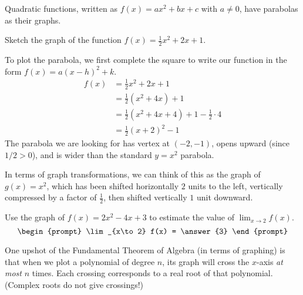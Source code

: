 \documentclass{ximera}
\begin{document}
Quadratic functions, written as $f(x) = ax^2 + bx + c$ with $a \ne 0$, have parabolas as their graphs.
\begin{example}
	Sketch the graph of the function $f(x) = \frac{1}{2} x^2 + 2x + 1$.
	\begin{explanation}
		To plot the parabola, we first complete the square to write our function in the form $f(x) = a(x-h)^2 +k$.
		\begin{align*}
			f(x) &= \frac{1}{2} x^2 + 2x + 1 \\
				&= \frac{1}{2} \left( x^2+ 4x \right) + 1\\
				&= \frac{1}{2}\left( x^2 + 4x + 4\right) + 1 - \frac{1}{2} \cdot 4\\
				&= \frac{1}{2} \left( x+2 \right)^2 -1
		\end{align*}
		The parabola we are looking for has vertex at $(-2, -1)$, opens upward (since $1/2 > 0$), and is wider than the standard
		$y=x^2$ parabola.
		
		In terms of graph transformations, we can think of this as the graph of $g(x) = x^2$, which has been shifted horizontally $2$ units to the left,
		vertically compressed by a factor of $\frac{1}{2}$, then shifted vertically $1$ unit downward.
	\end{explanation}
\end{example}


\begin{problem}
	Use the graph of $f(x) = 2x^2 - 4x + 3$ to estimate the value of $\lim_{x\to 2} f(x)$.
	\[ \begin{prompt} 
		\lim_{x\to 2} f(x) = \answer{3} 
	\end{prompt}\]
\end{problem} 




One upshot of the Fundamental Theorem of Algebra (in terms of graphing) is that when we plot a
polynomial of degree $n$, its graph will cross the $x$-axis \emph{at most}
$n$ times.  Each crossing corresponds to a real root of that polynomial.  (Complex roots do not give crossings!)
\end{document}

